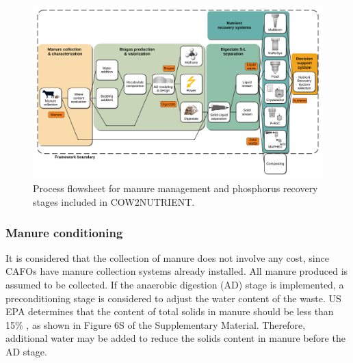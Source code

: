 \begin{refsection}[referencesCh4]
\begin{figure}[h]
	\centering
	\includegraphics[width=0.95\linewidth, trim=1cm 1cm 1cm 1cm, clip]{gfx/Chapter4/Process_Flowsheet2.pdf} 
	\caption{Process flowsheet for manure management and phosphorus recovery stages included in COW2NUTRIENT.}
	\label{fig:flowsheet}
\end{figure}

\subsubsection{Manure conditioning}
It is considered that the collection of manure does not involve any cost, since CAFOs have manure collection systems already installed. All manure produced is assumed to be collected. If the anaerobic digestion (AD) stage is implemented, a preconditioning stage is considered to adjust the water content of the waste. US EPA determines that the content of total solids in manure should be less than 15\% \citep{AgSTARHandbook}, as shown in Figure 6S of the Supplementary Material. Therefore, additional water may be added to reduce the solids content in manure before the AD stage.


\end{refsection}
